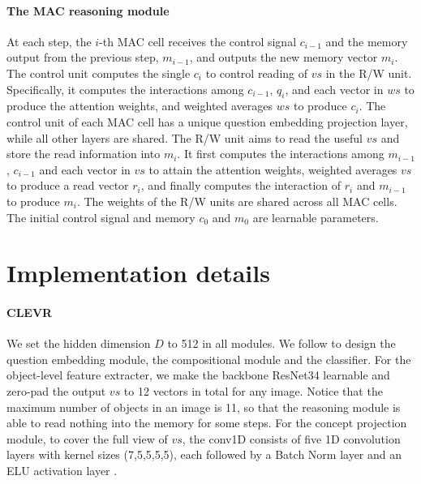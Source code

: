 \documentclass[10pt,twocolumn,letterpaper]{article}
\begin{document}
\paragraph{The MAC reasoning module}



At each step, the $i$-th MAC cell receives the control signal $c_{i-1}$ and the memory output from the previous step, $m_{i-1}$, and outputs the new memory vector $m_i$.
The control unit computes the single $c_i$ to control reading of $vs$ in the R/W unit. Specifically, it computes the interactions among $c_{i-1}$, $q_i$, and each vector in $ws$ to produce the attention weights, and weighted averages $ws$ to produce $c_i$. The control unit of each MAC cell has a unique question embedding projection layer, while all other layers are shared.
The R/W unit aims to read the useful $vs$ and store the read information into $m_i$. It first computes the interactions among $m_{i-1}$, $c_{i-1}$ and each vector in $vs$ to attain the attention weights, weighted averages $vs$ to produce a read vector $r_i$, and finally computes the interaction of $r_i$ and $m_{i-1}$ to produce $m_i$.  The weights of the R/W units are shared across all MAC cells. 
The initial control signal and memory $c_0$ and $m_0$ are learnable parameters. 



\section{Implementation details}
\label{app:training_details}

\paragraph{CLEVR}
We set the hidden dimension $D$ to 512 in all modules. We follow \cite{hudson2018compositional} to design the question embedding module, the compositional module and the classifier. For the object-level feature extracter, we make the backbone ResNet34 learnable and zero-pad the output $vs$ to 12 vectors in total for any image. Notice that the maximum number of objects in an image is 11, so that the reasoning module is able to read nothing into the memory for some steps. For the concept projection module, to cover the full view of $vs$, the conv1D consists of five 1D convolution layers with kernel sizes (7,5,5,5,5),
each followed by a Batch Norm layer \cite{ioffe2015batch} and an ELU activation layer \cite{clevert2015fast}. 
\end{document}
